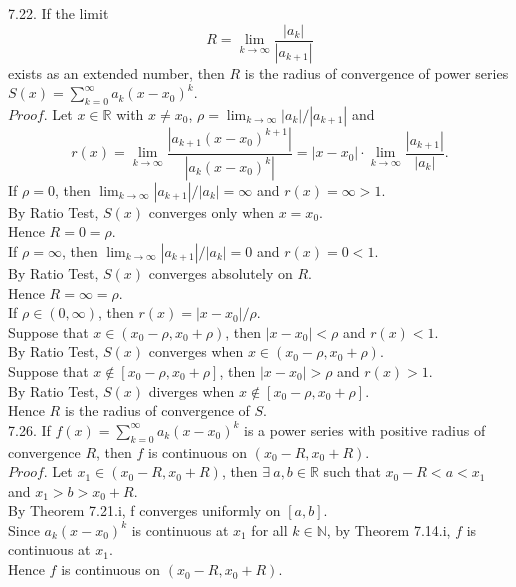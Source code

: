 \documentclass[12pt]{book}
\begin{document}
\begin{CJK}{UTF8}{bsmi}
7.22. If the limit 
\[
    R = \lim_{k\rightarrow\infty}\frac{|a_k|}{|a_{k+1}|}
\]
exists as an extended number, then $R$ is the radius of convergence of power series $S(x) = \sum_{k=0}^\infty a_k(x-x_0)^k$. \\
$Proof$. Let $x\in\mathbb{R}$ with $x\ne x_0$, $\rho = \lim_{k\rightarrow\infty}|a_k|/|a_{k+1}|$ and 
\[
    r(x) 
    = \lim_{k\rightarrow\infty} \frac{|a_{k+1}(x-x_0)^{k+1}|}{|a_k(x-x_0)^k|}
    = |x-x_0|\cdot\lim_{k\rightarrow\infty} \frac{|a_{k+1}|}{|a_k|}.
\]
If $\rho = 0$, then $\lim_{k\rightarrow\infty}|a_{k+1}|/|a_k| = \infty$ and $r(x) = \infty > 1$. \\
By Ratio Test, $S(x)$ converges only when $x=x_0$. \\
Hence $R = 0 = \rho$. \\
If $\rho = \infty$, then $\lim_{k\rightarrow\infty}|a_{k+1}|/|a_k| = 0$ and $r(x) = 0 < 1$. \\
By Ratio Test, $S(x)$ converges absolutely on $R$. \\
Hence $R = \infty = \rho$. \\
If $\rho\in(0, \infty)$, then $r(x) = |x-x_0|/\rho$. \\
Suppose that $x\in(x_0-\rho, x_0+\rho)$, then $|x-x_0| < \rho$ and $r(x)<1$. \\
By Ratio Test, $S(x)$ converges when $x\in(x_0-\rho, x_0+\rho)$. \\
Suppose that $x\not\in[x_0-\rho, x_0+\rho]$, then $|x-x_0| > \rho$ and $r(x)>1$. \\
By Ratio Test, $S(x)$ diverges when $x\not\in[x_0-\rho, x_0+\rho]$. \\
Hence $R$ is the radius of convergence of $S$. \\

7.26. If $f(x)=\sum_{k=0}^\infty a_k(x-x_0)^k$ is a power series with positive radius of convergence $R$, then $f$ is continuous on $(x_0-R, x_0+R)$. \\
$Proof$. Let $x_1\in(x_0-R, x_0+R)$, then $\exists\ a, b\in\mathbb{R}$ such that $x_0-R < a < x_1$ and $x_1 > b > x_0+R$. \\
By Theorem 7.21.i, f converges uniformly on $[a, b]$. \\
Since $a_k(x-x_0)^k$ is continuous at $x_1$ for all $k\in\mathbb{N}$, by Theorem 7.14.i, $f$ is continuous at $x_1$. \\
Hence $f$ is continuous on $(x_0-R, x_0+R)$. \\

\clearpage


\end{CJK}
\end{document}
